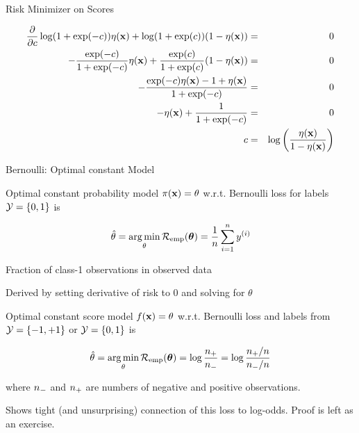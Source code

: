 \documentclass[11pt,compress,t,notes=noshow, xcolor=table]{beamer}
\begin{document}
\begin{vbframe}{Risk Minimizer on Scores}
\begin{footnotesize}
  \begin{eqnarray*}
  \frac{\partial }{\partial c} \log(1 + \exp(-c)) \eta(\mathbf{x})+ \log(1 + \exp(c)) (1 - \eta(\mathbf{x})) &=& 0 \\
  - \frac{\exp(-c)}{1 + \exp(-c)} \eta(\mathbf{x}) + \frac{\exp(c)}{1 + \exp(c)} (1 - \eta(\mathbf{x})) &=& 0 \\ 
  - \frac{\exp(-c) \eta(\mathbf{x}) - 1 + \eta(\mathbf{x})}{1 + \exp(-c)} &=& 0 \\
  - \eta(\mathbf{x}) + \frac{1}{1 + \exp(-c)} &=& 0\\
   c &=& \log\left(\frac{\eta(\mathbf{x})}{1 - \eta(\mathbf{x})}\right)
  \end{eqnarray*}
\end{footnotesize}

\end{vbframe}



\begin{vbframe}{Bernoulli: Optimal constant Model}

{\small 

\begin{itemizeS}
    \item Optimal constant probability model $\pi(\mathbf{x}) = \theta$ w.r.t. Bernoulli loss for labels $\mathcal{Y} = \{0, 1\}$ is 
    
    $$\hat{\theta} = \mathop{\mathrm{arg\,min}}_{\theta} \mathcal{R}_{\text{emp}}(\bm{\theta}) = \frac{1}{n} \sum\limits_{i=1}^n y^{(i)}$$
    \item Fraction of class-1 observations in observed data
    \item Derived by setting derivative of risk to $0$ and solving for $\theta$
    \item Optimal constant score model $f(\mathbf{x}) = \theta$ w.r.t. Bernoulli loss and labels from $\mathcal{Y} = \{-1, +1\}$ or $\mathcal{Y} = \{0, 1\}$ is

    $$\hat{\theta} = \mathop{\mathrm{arg\,min}}_{\theta} \mathcal{R}_{\text{emp}}(\bm{\theta}) = \log \frac{n_{+}}{n_{-}} = \log \frac{n_{+} / n}{n_{-} /n}$$ 

    where $n_{-}$ and $n_{+}$ are numbers of negative and positive observations.%

    \item Shows tight (and unsurprising) connection of this loss to log-odds. Proof is left as an exercise.
\end{itemizeS}

}





\end{vbframe}
\end{document}

